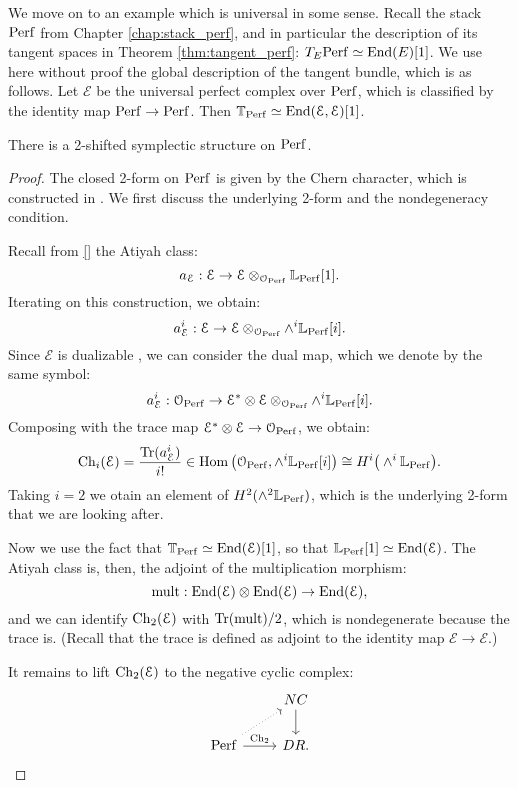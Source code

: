 We move on to an example which is universal in some sense. Recall the stack $\mathrm{Perf}$ from 
Chapter \ref{chap:stack_perf}, and in particular the description of its tangent spaces in Theorem \ref{thm:tangent_perf}:
$T_E \mathrm{Perf} \simeq \operatorname{End}(E)[1]$. We use here without proof the global description of the tangent bundle, which is as
follows. Let $\mathcal{E}$ be the universal perfect complex over $\mathrm{Perf}$, which is classified by the identity
map $\mathrm{Perf} \to \mathrm{Perf}$. Then $\mathbb T_{\mathrm{Perf}} \simeq \operatorname{End}(\mathcal{E}, \mathcal{E})[1]$.

\begin{thm}
\label{thm:symp_perf}
There is a 2-shifted symplectic structure on $\mathrm{Perf}$.
\end{thm}
\begin{proof}
The closed 2-form on $\mathrm{Perf}$ is given by the Chern character, which is constructed in \cite{TV_Chern}. We first discuss
the underlying 2-form and the nondegeneracy condition. 

Recall from \ref{} the Atiyah class:
\[	a_\mathcal{E} : \mathcal{E} \to \mathcal{E} \otimes_{\mathcal{O}_{\mathrm{Perf}}} \mathbb L_{\mathrm{Perf}}[1] .	\]
Iterating on this construction, we obtain:
\[	a_\mathcal{E}^i : \mathcal{E} \to \mathcal{E} \otimes_{\mathcal{O}_{\mathrm{Perf}}} \wedge^i \mathbb L_{\mathrm{Perf}}[i] .	\]
Since $\mathcal{E}$ is dualizable , we can consider the dual map, which we denote by the same
symbol:
\[	a_\mathcal{E}^i : \mathcal{O}_{\mathrm{Perf}} \to \mathcal{E}^* \otimes \mathcal{E} \otimes_{\mathcal{O}_{\mathrm{Perf}}} \wedge^i \mathbb L_{\mathrm{Perf}}[i].	\]
Composing with the trace map $\mathcal{E}^* \otimes \mathcal{E} \to \mathcal{O}_{\mathrm{Perf}}$, we obtain:
\[	\operatorname{Ch}_i(\mathcal E) = \frac{\operatorname{Tr}(a_\mathcal{E}^i)}{i!} \in \operatorname{Hom}\big(\mathcal{O}_{\mathrm{Perf}},\wedge^i \mathbb L_{\mathrm{Perf}}[i]\big) 
\cong H^i\big(\wedge^i \mathbb L_{\mathrm{Perf}}\big) .	\]
Taking $i=2$ we otain an element of $H^2(\wedge^2 \mathbb L_{\mathrm{Perf}})$, which is the underlying 2-form that we are looking after.

Now we use the fact that $\mathbb T_{\mathrm{Perf}} \simeq \operatorname{End}(\mathcal{E})[1]$, so that
$\mathbb L_{\mathrm{Perf}}[1] \simeq \operatorname{End}(\mathcal{E})$. The Atiyah class is, then, the adjoint of the multiplication morphism:
\[	\text{mult} : \operatorname{End}(\mathcal{E}) \otimes \operatorname{End}(\mathcal{E}) \to \operatorname{End}(\mathcal{E}),	\]
and we can identify $\operatorname{Ch}_2(\mathcal{E})$ with $\operatorname{Tr}(\text{mult})/2$, which is nondegenerate because the trace is. (Recall that
the trace is defined as adjoint to the identity map $\mathcal{E} \to \mathcal{E}$.)

It remains to lift $\operatorname{Ch}_2(\mathcal{E})$ to the negative cyclic complex:
\[
\begin{tikzcd}
\; & NC \arrow{d} \\
\Perf \arrow{r}{\Ch_2}\arrow[dotted]{ur} & DR .
\end{tikzcd}
\]
\end{proof}

